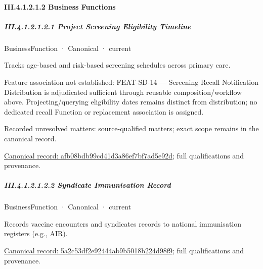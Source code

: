 \paragraph*{III.4.1.2.1.2 Business Functions}
\label{navigation:III.4.1.2.1.2}

\subparagraph*{III.4.1.2.1.2.1 Project Screening Eligibility Timeline}
\label{navigation:III.4.1.2.1.2.1}

\label{element:afb08bdb99cd41d3a86ef7bf7ad5e92d}
{\small BusinessFunction · Canonical · current}\par

Tracks age-based and risk-based screening schedules across primary care.



Feature association not established: FEAT-SD-14 — Screening Recall Notification Distribution is adjudicated sufficient through reusable composition/workflow above. Projecting/querying eligibility dates remains distinct from distribution; no dedicated recall Function or replacement association is assigned.


{\small Recorded unresolved matters: source-qualified matters; exact scope remains in the canonical record.}\par
{\footnotesize \href{../../../../../../../continuum/business/business-function/afb08bdb99cd41d3a86ef7bf7ad5e92d.md}{Canonical record: afb08bdb99cd41d3a86ef7bf7ad5e92d}; full qualifications and provenance.}\par
\subparagraph*{III.4.1.2.1.2.2 Syndicate Immunisation Record}
\label{navigation:III.4.1.2.1.2.2}

\label{element:5a2c53df2e92444ab9b5018b224d98f9}
{\small BusinessFunction · Canonical · current}\par

Records vaccine encounters and syndicates records to national immunisation registers (e.g., AIR).


{\footnotesize \href{../../../../../../../continuum/business/business-function/5a2c53df2e92444ab9b5018b224d98f9.md}{Canonical record: 5a2c53df2e92444ab9b5018b224d98f9}; full qualifications and provenance.}\par
